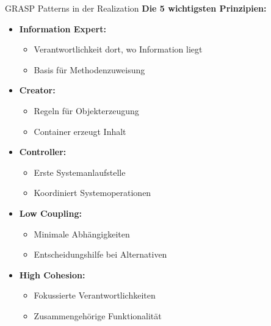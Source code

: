 \begin{KR}{GRASP Patterns in der Realization}
\textbf{Die 5 wichtigsten Prinzipien:}
\begin{itemize}
    \item \textbf{Information Expert:}
    \begin{itemize}
        \item Verantwortlichkeit dort, wo Information liegt
        \item Basis für Methodenzuweisung
    \end{itemize}
    \item \textbf{Creator:}
    \begin{itemize}
        \item Regeln für Objekterzeugung
        \item Container erzeugt Inhalt
    \end{itemize}
    \item \textbf{Controller:}
    \begin{itemize}
        \item Erste Systemanlaufstelle
        \item Koordiniert Systemoperationen
    \end{itemize}
    \item \textbf{Low Coupling:}
    \begin{itemize}
        \item Minimale Abhängigkeiten
        \item Entscheidungshilfe bei Alternativen
    \end{itemize}
    \item \textbf{High Cohesion:}
    \begin{itemize}
        \item Fokussierte Verantwortlichkeiten
        \item Zusammengehörige Funktionalität
    \end{itemize}
\end{itemize}
\end{KR}



